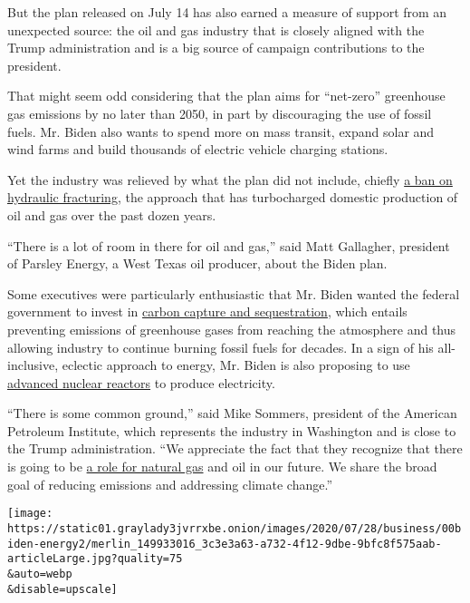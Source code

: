 But the plan released on July 14 has also earned a measure of support
from an unexpected source: the oil and gas industry that is closely
aligned with the Trump administration and is a big source of campaign
contributions to the president.

That might seem odd considering that the plan aims for ``net-zero''
greenhouse gas emissions by no later than 2050, in part by discouraging
the use of fossil fuels. Mr. Biden also wants to spend more on mass
transit, expand solar and wind farms and build thousands of electric
vehicle charging stations.

Yet the industry was relieved by what the plan did not include, chiefly
\href{https://www.nytimes3xbfgragh.onion/2020/07/09/us/politics/biden-sanders-task-force.html}{a
ban on hydraulic fracturing}, the approach that has turbocharged
domestic production of oil and gas over the past dozen years.

``There is a lot of room in there for oil and gas,'' said Matt
Gallagher, president of Parsley Energy, a West Texas oil producer, about
the Biden plan.

Some executives were particularly enthusiastic that Mr. Biden wanted the
federal government to invest in
\href{https://www.nytimes3xbfgragh.onion/2020/06/24/climate/carbon-capture-tax-break.html}{carbon
capture and sequestration}, which entails preventing emissions of
greenhouse gases from reaching the atmosphere and thus allowing industry
to continue burning fossil fuels for decades. In a sign of his
all-inclusive, eclectic approach to energy, Mr. Biden is also proposing
to use
\href{https://www.nytimes3xbfgragh.onion/2016/01/20/science/advanced-nuclear-reactors-department-of-energy.html}{advanced
nuclear reactors} to produce electricity.

``There is some common ground,'' said Mike Sommers, president of the
American Petroleum Institute, which represents the industry in
Washington and is close to the Trump administration. ``We appreciate the
fact that they recognize that there is going to be
\href{https://www.nytimes3xbfgragh.onion/2020/07/06/business/energy-environment/renewable-energy-natural-gas.html}{a
role for natural gas} and oil in our future. We share the broad goal of
reducing emissions and addressing climate change.''

\texttt{[image: https://static01.graylady3jvrrxbe.onion/images/2020/07/28/business/00biden-energy2/merlin\_149933016\_3c3e3a63-a732-4f12-9dbe-9bfc8f575aab-articleLarge.jpg?quality=75\\\&auto=webp\\\&disable=upscale]}

